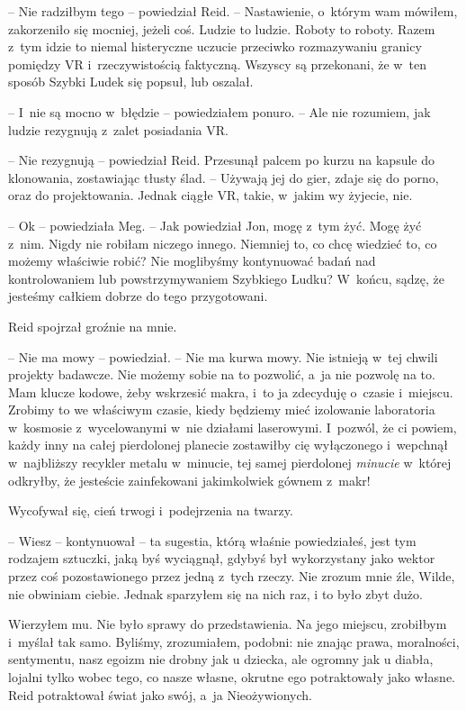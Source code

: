 \documentclass[oneside,polish,11pt,sfheadings]{mwbk}
\begin{document}
-- Nie radziłbym tego -- powiedział Reid. -- Nastawienie, o~którym wam
mówiłem, zakorzeniło się mocniej, jeżeli coś. Ludzie to ludzie. Roboty
to roboty. Razem z~tym idzie to niemal histeryczne uczucie przeciwko
rozmazywaniu granicy pomiędzy VR i~rzeczywistością faktyczną. Wszyscy są
przekonani, że w~ten sposób Szybki Ludek się popsuł, lub oszalał.

-- I~nie są mocno w~błędzie -- powiedziałem ponuro. -- Ale nie rozumiem,
jak ludzie rezygnują z~zalet posiadania VR.

-- Nie rezygnują -- powiedział Reid. Przesunął palcem po kurzu na kapsule
do klonowania, zostawiając tłusty ślad. -- Używają jej do gier, zdaje się
do porno, oraz do projektowania. Jednak ciągłe VR, takie, w~jakim wy
żyjecie, nie.

-- Ok -- powiedziała Meg. -- Jak powiedział Jon, mogę z~tym żyć. Mogę żyć z~nim. Nigdy nie robiłam niczego innego. Niemniej to, co chcę wiedzieć to,
co możemy właściwie robić? Nie moglibyśmy kontynuować badań nad
kontrolowaniem lub powstrzymywaniem Szybkiego Ludku? W~końcu, sądzę, że
jesteśmy całkiem dobrze do tego przygotowani.

Reid spojrzał groźnie na mnie.

-- Nie ma mowy -- powiedział. -- Nie ma kurwa mowy. Nie istnieją w~tej
chwili projekty badawcze. Nie możemy sobie na to pozwolić, a~ja nie
pozwolę na to. Mam klucze kodowe, żeby wskrzesić makra, i~to ja
zdecyduję o~czasie i~miejscu. Zrobimy to we właściwym czasie, kiedy
będziemy mieć izolowanie laboratoria w~kosmosie z~wycelowanymi w~nie
działami laserowymi. I~pozwól, że ci powiem, każdy inny na całej
pierdolonej planecie zostawiłby cię wyłączonego i~wepchnął w~najbliższy
recykler metalu w~minucie, tej samej pierdolonej \emph{minucie} w~której
odkryłby, że jesteście zainfekowani jakimkolwiek gównem z~makr!

Wycofywał się, cień trwogi i~podejrzenia na twarzy.

-- Wiesz -- kontynuował -- ta sugestia, którą właśnie powiedziałeś, jest
tym rodzajem sztuczki, jaką byś wyciągnął, gdybyś był wykorzystany jako
wektor przez coś pozostawionego przez jedną z~tych rzeczy. Nie zrozum
mnie źle, Wilde, nie obwiniam ciebie. Jednak sparzyłem się na nich raz,
i to było zbyt dużo.

Wierzyłem mu. Nie było sprawy do przedstawienia. Na jego miejscu,
zrobiłbym i~myślał tak samo. Byliśmy, zrozumiałem, podobni: nie znając
prawa, moralności, sentymentu, nasz egoizm nie drobny jak u dziecka, ale
ogromny jak u diabła, lojalni tylko wobec tego, co nasze własne, okrutne
ego potraktowały jako własne. Reid potraktował świat jako swój, a~ja
Nieożywionych.
\end{document}
